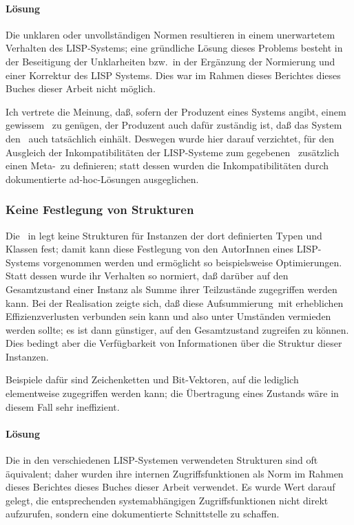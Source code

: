 \paragraph{L\"{o}sung}
Die unklaren oder unvollst\"{a}ndigen Normen resultieren in einem
unerwartetem Verhalten des LISP-Systems; eine gr\"{u}ndliche
L\"{o}sung dieses Problems besteht in der Beseitigung der Unklarheiten
bzw.\ in der Erg\"{a}nzung der Normierung und einer Korrektur des LISP
Systems. Dies war im Rahmen \ifbericht dieses Berichtes \else\ifbuch
dieses Buches \else dieser Arbeit \fi\fi nicht m\"{o}glich.
%
\par{}Ich vertrete die Meinung, da\ss{}, sofern der Produzent eines
Systems angibt, einem gewissem \std\ zu gen\"{u}gen, der Produzent auch
daf\"{u}r zust\"{a}ndig ist, da\ss{} das System den \std\ auch tats\"{a}chlich
einh\"{a}lt. Deswegen wurde hier darauf verzichtet, f\"{u}r den Ausgleich
der Inkompatibilit\"{a}ten der LISP-Systeme zum gegebenen
\std\ zu\-s\"{a}tz\-lich einen \rglq{}Meta\rgrq-\std\ zu definieren; statt
dessen wurden die Inkompatibilit\"{a}ten durch dokumentierte
ad-hoc-L\"{o}sungen ausgeglichen.
%
\subsubsection{Keine Festlegung von Strukturen}
%
Die \std[isierung]\ in \cite{bib:st90} legt keine Strukturen f\"{u}r
Instanzen der dort definierten Typen und Klassen fest; damit kann
diese Festlegung von den AutorInnen eines LISP-Systems vorgenommen
werden und erm\"{o}glicht so beispielsweise Optimierungen. Statt dessen
wurde ihr Verhalten so normiert, da\ss{} %
dar\"{u}ber auf den Gesamtzustand einer Instanz als Summe ihrer
Teilzust\"{a}nde zugegriffen werden kann. Bei der Realisation zeigte
sich, da\ss{} diese \rglq{}Aufsummierung\rgrq\ mit erheblichen
Effizienzverlusten verbunden sein kann und also unter Umst\"{a}nden
vermieden werden sollte; es ist dann g\"{u}nstiger, auf den Gesamtzustand
zugreifen zu k\"{o}n\-nen.  Dies bedingt aber die Verf\"{u}gbarkeit von
Informationen \"{u}ber die Struktur dieser Instanzen.
%
\par{}Beispiele daf\"{u}r sind Zeichenketten und Bit-Vektoren, auf die
lediglich elementweise zugegriffen werden kann; die \"{U}bertragung
eines Zustands w\"{a}re in diesem Fall sehr ineffizient.
%
\paragraph{L\"{o}sung}
Die in den verschiedenen LISP-Systemen verwendeten Strukturen sind oft
\"{a}quivalent; daher wurden ihre internen Zugriffsfunktionen als Norm
im Rahmen \ifbericht dieses Berichtes \else\ifbuch dieses Buches \else
dieser Arbeit \fi\fi verwendet. Es wurde Wert darauf gelegt, die
entsprechenden systemabh\"{a}ngigen Zugriffsfunktionen nicht direkt
aufzurufen, sondern eine dokumentierte Schnittstelle zu schaffen.
%
